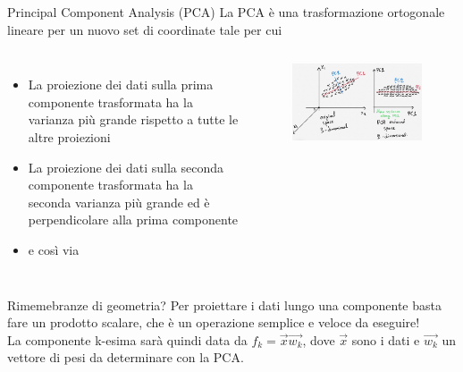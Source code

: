 \documentclass[
10pt,
aspectratio=169,
]{beamer}
\begin{document}
\begin{frame}{Principal Component Analysis (PCA)}
    La PCA è una trasformazione ortogonale lineare per un nuovo set di coordinate  tale per cui
    \begin{columns}
    \begin{itemize}
        \item La proiezione dei dati sulla prima componente trasformata ha la varianza più grande rispetto a tutte le altre proiezioni
        \item La proiezione dei dati sulla seconda componente trasformata ha la seconda varianza più grande ed è perpendicolare alla prima componente
        \item e così via
    \end{itemize}
    \begin{figure}
        \centering
        \includegraphics[width=\textwidth]{pca.jpg}
    \end{figure}
\end{columns}
\vfill
Rimemebranze di geometria? Per proiettare i dati lungo una componente basta fare un prodotto scalare, che è un operazione semplice e veloce da eseguire!\\
La componente k-esima sarà quindi data da  $f_k = \vec{x}\vec{w_k}$, dove $\vec{x}$ sono i  dati e $\vec{w_k}$ un vettore di pesi da determinare con la PCA.
\end{frame}
\end{document}
